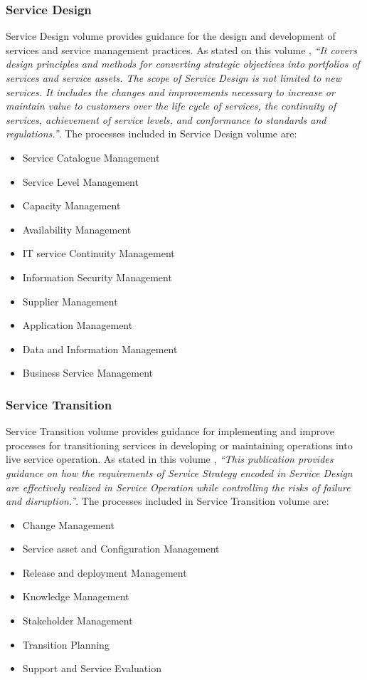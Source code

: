 \subsubsection{Service Design}

Service Design volume provides guidance for the design and development of services and service management practices. As stated on this volume \cite{itilSD}, \textit{``It covers design principles and methods for converting strategic objectives into portfolios of services and service assets. The scope of Service Design is not limited to new services. It includes the changes and improvements necessary to increase or maintain value to customers over the life cycle of services, the continuity of services, achievement of service levels, and conformance to standards and regulations.''}. The processes included in Service Design volume are:

\begin{itemize}
  \item Service Catalogue Management
  \item Service Level Management 
  \item Capacity Management
  \item Availability Management
  \item IT service Continuity Management
  \item Information Security Management 
  \item Supplier Management
  \item Application Management
  \item Data and Information Management
  \item Business Service Management
\end{itemize} 

\subsubsection{Service Transition} 

Service Transition volume provides guidance for implementing and improve processes for transitioning services in developing or maintaining operations into live service operation. As stated in this volume \cite{itilST}, \textit{``This publication provides guidance on how the requirements of Service Strategy encoded in Service Design are effectively realized in Service Operation while controlling the risks of failure and disruption.''}. The processes included in Service Transition volume are:

\begin{itemize}
  \item Change Management
  \item Service asset and Configuration Management
  \item Release and deployment Management
  \item Knowledge Management
  \item Stakeholder Management
  \item Transition Planning 
  \item Support and Service Evaluation 
\end{itemize} 


